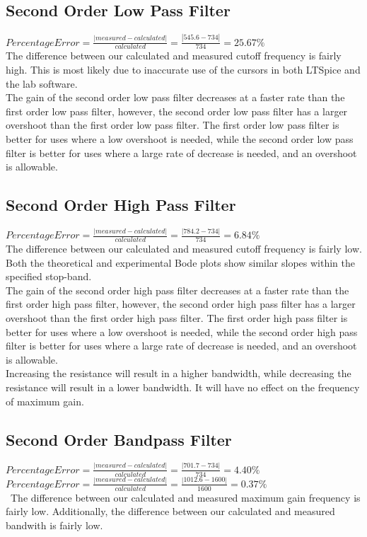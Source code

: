 \documentclass[10pt]{article}
\begin{document}
\subsection*{Second Order Low Pass Filter}
$Percentage Error = \frac{|measured-calculated|}{calculated} = \frac{|545.6-734|}{734} = 25.67\%$\\
\noindent The difference between our calculated and measured cutoff frequency is fairly high. This is most likely due to inaccurate use of the cursors in both LTSpice and the lab software.\\

\noindent The gain of the second order low pass filter decreases at a faster rate than the first order low pass filter, however, the second order low pass filter has a larger overshoot than the first order low pass filter. The first order low pass filter is better for uses where a low overshoot is needed, while the second order low pass filter is better for uses where a large rate of decrease is needed, and an overshoot is allowable.

\subsection*{Second Order High Pass Filter}
$Percentage Error = \frac{|measured-calculated|}{calculated} = \frac{|784.2-734|}{734} = 6.84\%$\\
\noindent The difference between our calculated and measured cutoff frequency is fairly low.\\

\noindent Both the theoretical and experimental Bode plots show similar slopes within the specified stop-band.\\

\noindent The gain of the second order high pass filter decreases at a faster rate than the first order high pass filter, however, the second order high pass filter has a larger overshoot than the first order high pass filter. The first order high pass filter is better for uses where a low overshoot is needed, while the second order high pass filter is better for uses where a large rate of decrease is needed, and an overshoot is allowable.\\

\noindent Increasing the resistance will result in a higher bandwidth, while decreasing the resistance will result in a lower bandwidth. It will have no effect on the frequency of maximum gain.

\subsection*{Second Order Bandpass Filter}
$Percentage Error = \frac{|measured-calculated|}{calculated} = \frac{|701.7-734|}{734} = 4.40\%$\\
$Percentage Error = \frac{|measured-calculated|}{calculated} = \frac{|1012.6-1600|}{1600} = 0.37\%$\\\
\noindent The difference between our calculated and measured maximum gain frequency is fairly low. Additionally, the difference between our calculated and measured bandwith is fairly low.
\end{document}
